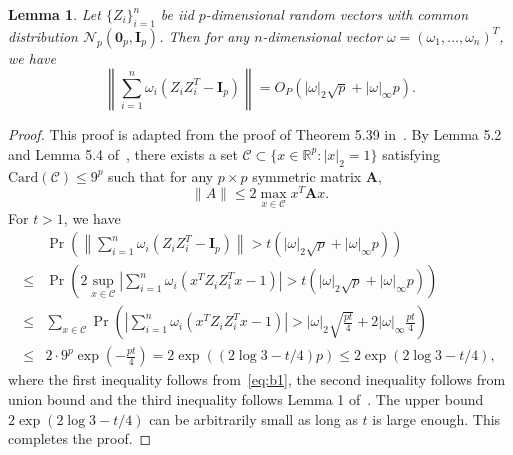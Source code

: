 \documentclass[12pt]{article} %
\newcommand{\bA}{\mathbf{A}}
\newcommand{\bI}{\mathbf{I}}
\newtheorem{lemma}{Lemma}
\theoremstyle{definition}
\begin{document}
\begin{appendices}
\begin{lemma}\label{lemma:con}
    Let $\{Z_i\}_{i=1}^n$ be iid $p$-dimensional random vectors with common distribution $\mathcal{N}_p(\mathbf{0}_p,\bI_p)$.
    Then for any $n$-dimensional vector $\omega=(\omega_1,\ldots,\omega_n)^T$, we have
\begin{equation*}
    \left\|\sum_{i=1}^n \omega_i(Z_i Z_i^T - \bI_p)\right\|=O_P(|\omega|_2 \sqrt{p}+|\omega|_{\infty}p).
\end{equation*}
\end{lemma}
\begin{proof}
    This proof is adapted from the proof of Theorem 5.39 in~\cite{Vershynin2010Introduction}.
    By Lemma 5.2 and Lemma 5.4 of~\cite{Vershynin2010Introduction}, there exists a set $\mathcal{C}\subset \{x\in\mathbb{R}^p: |x|_2=1\}$ satisfying $\text{Card} (\mathcal{C})\leq 9^p$ such that for any $p\times p$ symmetric matrix $\bA$,
    \begin{equation}\label{eq:b1}
    \|A\|\leq 2\max_{x\in\mathcal{C}} x^T \bA x.
\end{equation}
For $t>1$, we have
\begin{equation*}
    \begin{split}
        &\Pr\left(
            \left\|\sum_{i=1}^n \omega_i(Z_i Z_i^T - \bI_p)\right\|
            > t (|\omega|_2 \sqrt{p}+|\omega|_{\infty} p)
        \right)
        \\
        \leq &
        \Pr\left(
            2\sup_{x\in\mathcal{C}}\left|\sum_{i=1}^n \omega_i(x^T Z_i Z_i^T x - 1)\right|
            > t (|\omega|_2 \sqrt{p}+|\omega|_{\infty} p)
        \right)
        \\
        \leq &
        \sum_{x\in\mathcal{C}}
        \Pr\left(
            \left|\sum_{i=1}^n \omega_i(x^T Z_i Z_i^T x - 1)\right|
            >  |\omega|_2 \sqrt{\frac{pt}{4}}+2|\omega|_{\infty} \frac{pt}{4}
        \right)
        \\
        \leq & 2\cdot 9^{p} \exp\left(-\frac{pt}{4}\right)
        =2\exp\left((2\log 3 -t/4)p\right)
        \leq 2\exp\left(2\log 3 -t/4\right)
        ,
    \end{split}
\end{equation*}
where the first inequality follows from~\eqref{eq:b1}, the second inequality follows from union bound and the third inequality follows Lemma 1 of~\cite{Laurent2000Adaptive}.
The upper bound $2\exp\left(2\log 3 -t/4\right)$ can be arbitrarily small as long as $t$ is large enough.
This completes the proof.
\end{proof}


\end{appendices}
\end{document}
